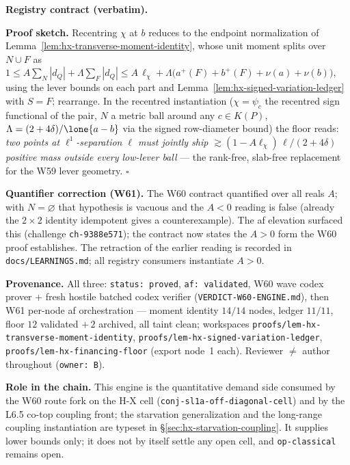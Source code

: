 \noindent\textbf{Registry contract (verbatim).}

\noindent\textbf{Proof sketch.} Recentring $\chi$ at $b$ reduces to the endpoint
normalization of Lemma~\ref{lem:hx-transverse-moment-identity}, whose unit moment
splits over $N\cup F$ as
$1\le A\sum_N|d_Q|+\Lambda\sum_F|d_Q|\le A\,\ell_\chi+
\Lambda\bigl(a^+(F)+b^+(F)+\nu(a)+\nu(b)\bigr)$,
using the lever bounds on each part and
Lemma~\ref{lem:hx-signed-variation-ledger} with $S=F$; rearrange. In the recentred
instantiation ($\chi=\psi_c$ the recentred sign functional of the pair, $N$ a metric
ball around any $c\in K(P)$, $\Lambda=(2+4\delta)/\lone{a-b}$ via the signed
row-diameter bound) the floor reads: \emph{two points at $\ell^1$-separation $\ell$
must jointly ship $\gtrsim(1-A\ell_\chi)\,\ell/(2+4\delta)$ positive mass outside
every low-lever ball} --- the rank-free, slab-free replacement for the W59 lever
geometry. \hfill$\square$

\noindent\textbf{Quantifier correction (W61).} The W60 contract quantified over all
reals $A$; with $N=\varnothing$ that hypothesis is vacuous and the $A<0$ reading is
false (already the $2\times2$ identity idempotent gives a counterexample). The af
elevation surfaced this (challenge \texttt{ch-9388e571}); the contract now states
the $A>0$ form the W60 proof establishes. The retraction of the earlier reading is
recorded in \texttt{docs/LEARNINGS.md}; all registry consumers instantiate $A>0$.

\noindent\textbf{Provenance.} All three: \texttt{status: proved},
\texttt{af: validated}, W60 wave codex prover + fresh hostile batched codex verifier
(\texttt{VERDICT-W60-ENGINE.md}), then W61 per-node af orchestration --- moment
identity $14/14$ nodes, ledger $11/11$, floor $12$ validated $+\,2$ archived, all
taint clean; workspaces \texttt{proofs/lem-hx-transverse-moment-identity},
\texttt{proofs/lem-hx-signed-variation-ledger},
\texttt{proofs/lem-hx-financing-floor} (export node~1 each). Reviewer $\neq$ author
throughout (\texttt{owner: B}).

\noindent\textbf{Role in the chain.} This engine is the quantitative demand side
consumed by the W60 route fork on the H-X cell
(\texttt{conj-sl1a-off-diagonal-cell}) and by the L6.5 co-top coupling front; the
starvation generalization and the long-range coupling instantiation are typeset in
\S\ref{sec:hx-starvation-coupling}. It supplies lower bounds only; it does not by
itself settle any open cell, and \texttt{op-classical} remains open.
